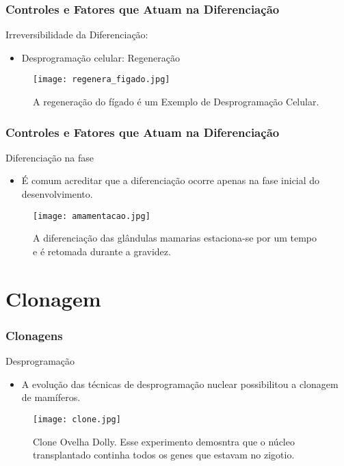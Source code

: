 \documentclass[brazil]{beamer}
\begin{document}
\begin{frame}
  \frametitle{Controles e Fatores que Atuam na Diferenciação}
  \raggedright
   \begin{block}{Irreversibilidade da Diferenciação:}
    \footnotesize 
	\begin{itemize}
	  \item Desprogramação celular: Regeneração
	\end{itemize}
    \end{block}

    \begin{figure}
      \texttt{[image: regenera\_figado.jpg]}
      \caption{\tiny A regeneração do fígado é um Exemplo de Desprogramação Celular.}
    \end{figure}
\end{frame}

\begin{frame}
  \frametitle{Controles e Fatores que Atuam na Diferenciação}
  \raggedright
     \begin{block}{Diferenciação na fase }
    \footnotesize 
	\begin{itemize}
	    \item É comum acreditar que a diferenciação ocorre apenas na fase inicial do desenvolvimento.
	\end{itemize}
    \end{block}
    

    \pause
    \begin{figure}
        \texttt{[image: amamentacao.jpg]}
	\caption{\tiny A diferenciação das glândulas mamarias estaciona-se por um tempo e é retomada durante a gravidez.}
    \end{figure}
\end{frame}

\section{Clonagem}

\begin{frame}
\frametitle{Clonagens}

   \begin{block}{Desprogramação}
    \footnotesize 
	\begin{itemize}
	    \item A evolução das técnicas de desprogramação nuclear possibilitou a clonagem de mamíferos.
	\end{itemize}
   \end{block}
   \begin{figure}
      \texttt{[image: clone.jpg]}
      \caption{\tiny Clone Ovelha Dolly. Esse experimento demosntra que o núcleo transplantado continha todos os genes que estavam no zigotio.}
   \end{figure}
\end{frame}
\end{document}
